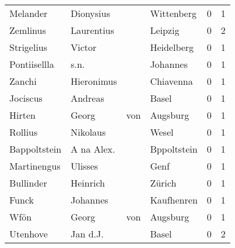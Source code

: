 \begin{tabular}{llllrr}
                 Melander &                          Dionysius &             &                                  Wittenberg &          0 &         1 \\
                 Zemlinus &                         Laurentius &             &                                     Leipzig &          0 &         2 \\
               Strigelius &                             Victor &             &                                  Heidelberg &          0 &         1 \\
             Pontiisellla &                               s.n. &             &                                    Johannes &          0 &         1 \\
                   Zanchi &                         Hieronimus &             &                                   Chiavenna &          0 &         1 \\
                 Jociscus &                            Andreas &             &                                       Basel &          0 &         1 \\
                   Hirten &                              Georg &         von &                                    Augsburg &          0 &         1 \\
                  Rollius &                           Nikolaus &             &                                       Wesel &          0 &         1 \\
             Bappoltstein &                         A na Alex. &             &                                 Bppoltstein &          0 &         1 \\
              Martinengus &                            Ulisses &             &                                        Genf &          0 &         1 \\
                Bullinder &                           Heinrich &             &                                      Zürich &          0 &         1 \\
                    Funck &                           Johannes &             &                                  Kaufhenren &          0 &         1 \\
                     Wfön &                              Georg &         von &                                    Augsburg &          0 &         1 \\
                 Utenhove &                           Jan d.J. &             &                                       Basel &          0 &         2 \\

\end{tabular}
